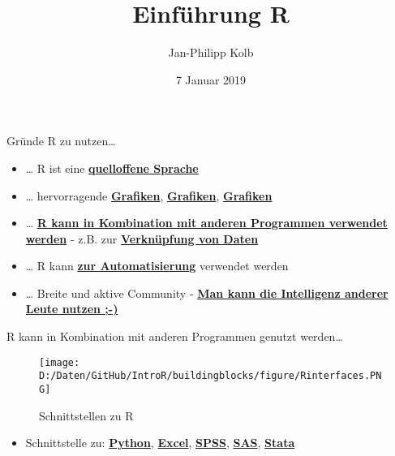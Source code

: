 \documentclass[ignorenonframetext,]{beamer}
\title{Einführung R}
\author{Jan-Philipp Kolb}
\date{7 Januar 2019}
\providecommand{\tightlist}{%
  \setlength{\itemsep}{0pt}\setlength{\parskip}{0pt}}
\begin{document}
\frame{\titlepage}

\begin{frame}{Gründe R zu nutzen\ldots{}}
\protect\hypertarget{grunde-r-zu-nutzen}{}

\begin{itemize}
\item
  \ldots{} R ist eine
  \href{https://stackoverflow.com/questions/1546583/what-is-the-definition-of-an-open-source-programming-language}{\textbf{quelloffene
  Sprache}}
\item
  \ldots{} hervorragende
  \href{http://matthewlincoln.net/2014/12/20/adjacency-matrix-plots-with-r-and-ggplot2.html}{\textbf{Grafiken}},
  \href{https://www.r-bloggers.com/3d-plots-with-ggplot2-and-plotly\%20/}{\textbf{Grafiken}},
  \href{https://procomun.wordpress.com/2011/03/18/splomr/}{\textbf{Grafiken}}
\item
  \ldots{} \href{https://github.com/Japhilko/RInterfaces}{\textbf{R kann
  in Kombination mit anderen Programmen verwendet werden}} - z.B. zur
  \href{https://github.com/Japhilko/RInterfaces/blob/master/slides/Datenimport.md}{\textbf{Verknüpfung
  von Daten}}
\item
  \ldots{} R kann
  \href{https://cran.r-project.org/web/packages/MplusAutomation/index.html}{\textbf{zur
  Automatisierung}} verwendet werden
\item
  \ldots{} Breite und aktive Community -
  \href{https://www.r-bloggers.com/}{\textbf{Man kann die Intelligenz
  anderer Leute nutzen ;-)}}
\end{itemize}

\end{frame}

\begin{frame}{R kann in Kombination mit anderen Programmen genutzt
werden\ldots{}}
\protect\hypertarget{r-kann-in-kombination-mit-anderen-programmen-genutzt-werden}{}

\begin{figure}
\centering
\texttt{[image: D:/Daten/GitHub/IntroR/buildingblocks/figure/Rinterfaces.PNG]}
\caption{Schnittstellen zu R}
\end{figure}

\begin{itemize}
\tightlist
\item
  Schnittstelle zu:
  \href{https://cran.r-project.org/web/packages/reticulate/vignettes/calling_python.html}{\textbf{Python}},
  \href{https://www.springer.com/de/book/9781441900517}{\textbf{Excel}},
  \href{https://www.ibm.com/support/knowledgecenter/en/SSFUEU_7.2.0/com.ibm.swg.ba.cognos.op_capmod_ig.7.2.0.doc/t_essentials_for_r_statistics.html}{\textbf{SPSS}},
  \href{https://cran.r-project.org/web/packages/SASmixed/index.html}{\textbf{SAS}},
  \href{https://cran.r-project.org/web/packages/RStata/index.html}{\textbf{Stata}}
\end{itemize}

\end{frame}
\end{document}

